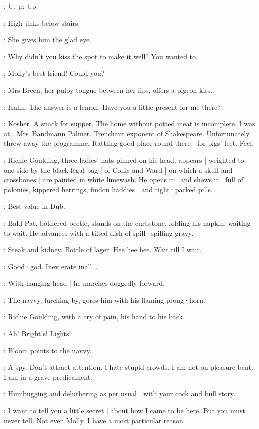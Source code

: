 \AlfBergan:
U.~p:
Up.

\MrsBreen:
High jinks below stairs.

:
She gives him the glad eye.

\MrsBreen:
Why didn't you kiss the spot to make it well?
You wanted to.

\Bloom:
Molly's best friend!
Could you?

:
Mrs Breen,
her pulpy tongue between her lips,
offers a pigeon kiss.

\MrsBreen:
Hnhn.
The answer is a lemon.
Have you a little present for me there?

\Bloom:
Kosher.
A snack for supper.
The home without potted meat is incomplete.
I was at .
Mrs~Bandmann Palmer.
Trenchant exponent of Shakespeare.
Unfortunately threw away the programme.
Rattling good place round there |
for pigs' feet.
Feel.

:
Richie Goulding,
three ladies' hats pinned on his head,
appears |
weighted to one side by the black legal bag |
of 
Collis and Ward |
on which a skull and crossbones |
are painted in white limewash.
He opens it |
and shows it |
full of polonies,
kippered herrings,
findon haddies |
and tight·packed pills.

\Richie:
Best value in Dub.

:
Bald Pat,
bothered beetle,
stands on the curbstone,
folding his napkin,
waiting to wait.
He advances with a tilted dish of spill·spilling gravy.

\Pat:
Steak and kidney.
Bottle of lager.
Hee hee hee.
Wait till I wait.

\Richie[2]:
Good·god.
Inev erate inall \ldots

:
With hanging head |
he marches doggedly forward.

:
The navvy,
lurching by,
gores him with his flaming prong·horn.

:
Richie Goulding,
with a cry of pain,
his hand to his back.

\Richie:
Ah!
Bright's!
Lights!

:
Bloom points to the navvy.

\Bloom:
A spy.
Don't attract attention.
I hate stupid crowds.
I am not on pleasure bent.
I am in a grave predicament.

\MrsBreen:
Humbugging and deluthering as per usual |
with your cock and bull story.

\Bloom:
I want to tell you a little secret |
about how I came to be here.
But you must never tell.
Not even Molly.
I have a most particular reason.

